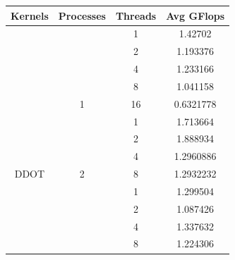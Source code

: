 \begin{table}[]
    \centering
    \begin{tabular}{cccc}
    \hline
Kernels                  & Processes                                   & Threads                    & Avg GFlops                        \\ \hline \hline
                         & \cellcolor[HTML]{EFEFEF}                    & \cellcolor[HTML]{EFEFEF}1  & \cellcolor[HTML]{EFEFEF}1.42702   \\
                         & \cellcolor[HTML]{EFEFEF}                    & 2                          & 1.193376                          \\
                         & \cellcolor[HTML]{EFEFEF}                    & \cellcolor[HTML]{EFEFEF}4  & \cellcolor[HTML]{EFEFEF}1.233166  \\
                         & \cellcolor[HTML]{EFEFEF}                    & 8                          & 1.041158                          \\
                         & \multirow{-5}{*}{\cellcolor[HTML]{EFEFEF}1} & \cellcolor[HTML]{EFEFEF}16 & \cellcolor[HTML]{EFEFEF}0.6321778 \\ \cline{3-4} 
                         &                                             & 1                          & 1.713664                          \\
                         &                                             & \cellcolor[HTML]{EFEFEF}2  & \cellcolor[HTML]{EFEFEF}1.888934  \\
                         &                                             & 4                          & 1.2960886                         \\
\multirow{-9}{*}{DDOT}   & \multirow{-4}{*}{2}                         & \cellcolor[HTML]{EFEFEF}8  & \cellcolor[HTML]{EFEFEF}1.2932232 \\ \hline
                         & \cellcolor[HTML]{EFEFEF}                    & 1                          & 1.299504                          \\
                         & \cellcolor[HTML]{EFEFEF}                    & \cellcolor[HTML]{EFEFEF}2  & \cellcolor[HTML]{EFEFEF}1.087426  \\
                         & \cellcolor[HTML]{EFEFEF}                    & 4                          & 1.337632                          \\
                         & \cellcolor[HTML]{EFEFEF}                    & \cellcolor[HTML]{EFEFEF}8  & \cellcolor[HTML]{EFEFEF}1.224306  \\

\end{tabular}
\end{table}

